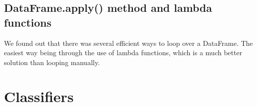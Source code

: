 \documentclass[a4paper,11pt]{article}
\begin{document}
\subsection{DataFrame.apply() method and lambda functions}
We found out that there was several efficient ways to loop over a DataFrame. The easiest way being through the use of lambda functions, which is a much better solution than looping manually.\\





\section{Classifiers}



\end{document}
